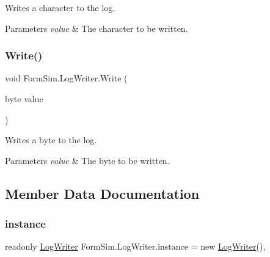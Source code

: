 Writes a character to the log. 


\begin{DoxyParams}{Parameters}
{\em value} & The character to be written.\\
\hline
\end{DoxyParams}
\mbox{\label{class_form_sim_1_1_log_writer_a50cd130c993c0412f9e563f9baabb8b4}} 
\subsubsection{\texorpdfstring{Write()}{Write()}\hspace{0.1cm}{\footnotesize\ttfamily [3/3]}}
{\footnotesize\ttfamily void Form\+Sim.\+Log\+Writer.\+Write (\begin{DoxyParamCaption}\item[{byte}]{value }\end{DoxyParamCaption})\hspace{0.3cm}{\ttfamily [inline]}}



Writes a byte to the log. 


\begin{DoxyParams}{Parameters}
{\em value} & The byte to be written.\\
\hline
\end{DoxyParams}


\subsection{Member Data Documentation}
\mbox{\label{class_form_sim_1_1_log_writer_aa018a2effe4cf7a046fd44fe337386aa}} 
\subsubsection{\texorpdfstring{instance}{instance}}
{\footnotesize\ttfamily readonly \mbox{\hyperlink{class_form_sim_1_1_log_writer}{Log\+Writer}} Form\+Sim.\+Log\+Writer.\+instance = new \mbox{\hyperlink{class_form_sim_1_1_log_writer}{Log\+Writer}}()\hspace{0.3cm}{\ttfamily [static]}, {\ttfamily [private]}}


